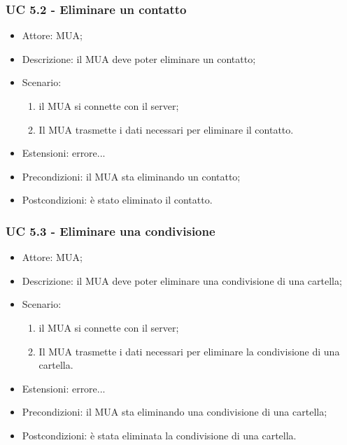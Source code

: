     \subsubsection{UC 5.2 - Eliminare un contatto} \label{sec: UC 5.2}
    \begin{itemize}
        \item Attore: MUA;
        \item Descrizione: il MUA deve poter eliminare un contatto;
        \item Scenario:
        \begin{enumerate}
        \item il MUA si connette con il server;
        \item Il MUA trasmette i dati necessari per eliminare il contatto.
        \end{enumerate}
        \item Estensioni: errore...
        \item Precondizioni: il MUA sta eliminando un contatto;
        \item Postcondizioni: è stato eliminato il contatto.
    \end{itemize}

    \subsubsection{UC 5.3 - Eliminare una condivisione} \label{sec: UC 5.3}
    \begin{itemize}
        \item Attore: MUA;
        \item Descrizione: il MUA deve poter eliminare una condivisione di una cartella;
        \item Scenario:
        \begin{enumerate}
        \item il MUA si connette con il server;
        \item Il MUA trasmette i dati necessari per eliminare la condivisione di una cartella.
        \end{enumerate}
        \item Estensioni: errore...
        \item Precondizioni: il MUA sta eliminando una condivisione di una cartella;
        \item Postcondizioni: è stata eliminata la condivisione di una cartella.
    \end{itemize}

